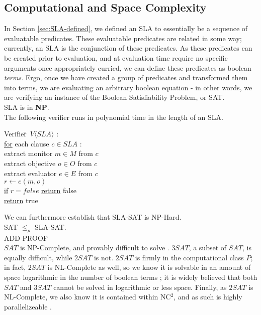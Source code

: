 \subsection{Computational and Space Complexity}
In Section \ref{sec:SLA-defined}, we defined an SLA to essentially be a sequence of evaluatable predicates.  These evaluatable predicates are related in some way; currently, an SLA is the conjunction of these predicates.  As these predicates can be created prior to evaluation, and at evaluation time require no specific arguments once appropriately curried, we can define these predicates as boolean {\it terms}.  Ergo, once we have created a group of predicates and transformed them into terms, we are evaluating an arbitrary boolean equation - in other words, we are verifying an instance of the Boolean Satisfiability Problem, or SAT.\\

 SLA is in {\bf NP}.\\

 The following verifier runs in polynomial time in the length of an SLA.\\

\begin{tabbing}
\noindent Veri\=fier\=~$V \langle SLA \rangle$ : \\
\> \underline{for} each clause $ c \in SLA $ :\\
\>\> extract monitor $ m \in M $ from $ c $\\
\>\> extract objective $ o \in O $ from $ c $\\
\>\> extract evaluator $ e \in E $ from $ c $\\
\>\> $ r \leftarrow e ( m, o ) $\\
\>\> \underline{if} $ r = false $ \underline{return} false\\
\> \underline{return} true\\
\end{tabbing}

\noindent We can furthermore establish that SLA-SAT is NP-Hard.\\

 SAT $ \leq_{p} $ SLA-SAT.\\

 ADD PROOF \\

$ SAT $ is NP-Complete, and provably difficult to solve \cite{comptheory:sipser:intro-comp-theory}.  $ 3SAT $, a subset of $ SAT $, is equally difficult, while $ 2SAT $ is not.  $ 2SAT $ is firmly in the computational class $ P $; in fact, $ 2SAT $ is NL-Complete as well, so we know it is solvable in an amount of space logarithmic in the number of boolean terms \cite{comptheory:papadimitriou:computational-complexity}; it is widely believed that both $ SAT $ and $ 3SAT $ cannot be solved in logarithmic or less space.  Finally, as $ 2SAT $ is NL-Complete, we also know it is contained within NC$^{2}$, and as such is highly parallelizeable \cite{comptheory:papadimitriou:computational-complexity}.


